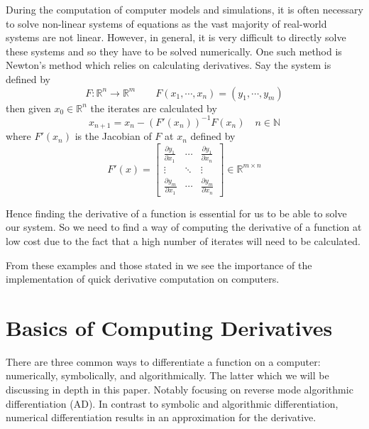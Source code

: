 \documentclass{article}
\begin{document}
During the computation of computer models and simulations, it is often necessary to solve non-linear systems of equations as the vast majority of real-world systems are not linear. However, in general, it is very difficult to directly solve these systems and so they have to be solved numerically. One such method is Newton's method which relies on calculating derivatives. Say the system is defined by
\begin{equation} \label{Fxy}
        F: \mathbb{R}^n \rightarrow \mathbb{R}^m \qquad F(x_1, \cdots, x_n) = (y_1, \cdots, y_m)
\end{equation}
then given $x_0 \in \mathbb{R}^n$ the iterates are calculated by
\begin{equation}
x_{n+1} = x_n - (F'(x_n))^{-1}F(x_n) \quad n \in \mathbb{N}
\end{equation}
where $F'(x_n)$ is the Jacobian of $F$ at $x_n$ defined by
\begin{equation} \label{jacobian}
    F'(x) = \begin{bmatrix}
        \frac{\partial y_1}{\partial x_1} & \cdots & \frac{\partial y_1}{\partial x_n} \\
        \vdots & \ddots & \vdots \\
        \frac{\partial y_m}{\partial x_1} & \cdots & \frac{\partial y_m}{\partial x_n}
    \end{bmatrix} \in \mathbb{R}^{m \times n}
\end{equation}

Hence finding the derivative of a function is essential for us to be able to solve our system. So we need to find a way of computing the derivative of a function at low cost due to the fact that a high number of iterates will need to be calculated.

From these examples and those stated in \cite{appad} we see the importance of the implementation of quick derivative computation on computers.

\section{Basics of Computing Derivatives}

There are three common ways to differentiate a function on a computer: numerically, symbolically, and algorithmically. The latter which we will be discussing in depth in this paper. Notably focusing on reverse mode algorithmic differentiation (AD). In contrast to symbolic and algorithmic differentiation, numerical differentiation results in an approximation for the derivative.
\end{document}
